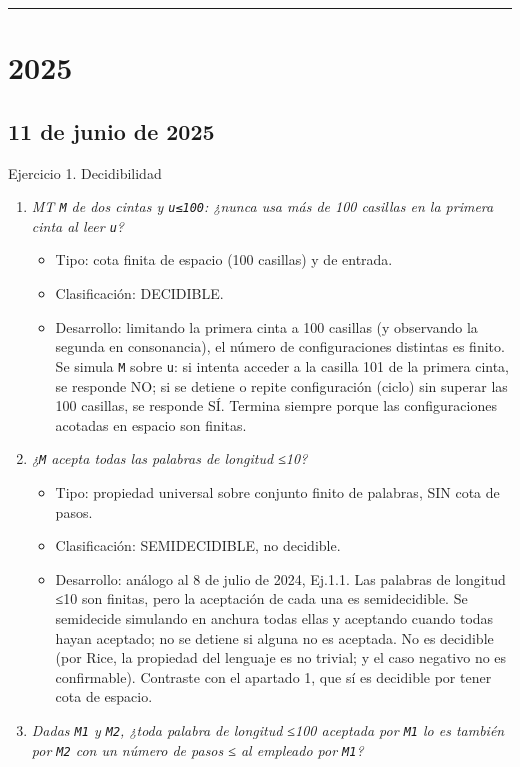 \documentclass[12pt]{book} %
\providecommand{\tightlist}{%
  \setlength{\itemsep}{0pt}\setlength{\parskip}{0pt}}
\begin{document}
\begin{center}\rule{0.5\linewidth}{0.5pt}\end{center}

\hypertarget{section-4}{%
\section{2025}\label{section-4}}

\hypertarget{de-junio-de-2025}{%
\subsection{11 de junio de 2025}\label{de-junio-de-2025}}

Ejercicio 1. Decidibilidad

\begin{enumerate}
\def\labelenumi{\arabic{enumi}.}
\tightlist
\item
  \emph{MT \texttt{M} de dos cintas y
  \texttt{\textbar{}u\textbar{}≤100}: ¿nunca usa más de 100 casillas en
  la primera cinta al leer \texttt{u}?}

  \begin{itemize}
  \tightlist
  \item
    Tipo: cota finita de espacio (100 casillas) y de entrada.
  \item
    Clasificación: DECIDIBLE.
  \item
    Desarrollo: limitando la primera cinta a 100 casillas (y observando
    la segunda en consonancia), el número de configuraciones distintas
    es finito. Se simula \texttt{M} sobre \texttt{u}: si intenta acceder
    a la casilla 101 de la primera cinta, se responde NO; si se detiene
    o repite configuración (ciclo) sin superar las 100 casillas, se
    responde SÍ. Termina siempre porque las configuraciones acotadas en
    espacio son finitas.
  \end{itemize}
\item
  \emph{¿\texttt{M} acepta todas las palabras de longitud ≤10?}

  \begin{itemize}
  \tightlist
  \item
    Tipo: propiedad universal sobre conjunto finito de palabras, SIN
    cota de pasos.
  \item
    Clasificación: SEMIDECIDIBLE, no decidible.
  \item
    Desarrollo: análogo al 8 de julio de 2024, Ej.1.1. Las palabras de
    longitud ≤10 son finitas, pero la aceptación de cada una es
    semidecidible. Se semidecide simulando en anchura todas ellas y
    aceptando cuando todas hayan aceptado; no se detiene si alguna no es
    aceptada. No es decidible (por Rice, la propiedad del lenguaje es no
    trivial; y el caso negativo no es confirmable). Contraste con el
    apartado 1, que sí es decidible por tener cota de espacio.
  \end{itemize}
\item
  \emph{Dadas \texttt{M1} y \texttt{M2}, ¿toda palabra de longitud ≤100
  aceptada por \texttt{M1} lo es también por \texttt{M2} con un número
  de pasos ≤ al empleado por \texttt{M1}?}


\end{enumerate}
\end{document}
